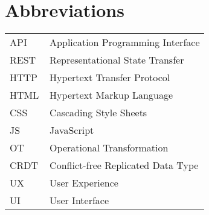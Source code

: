 \chapter*{Abbreviations}


\begin{flushleft}
\begin{tabular}{l p{0.8\linewidth}}
API      & Application Programming Interface\\
REST     & Representational State Transfer\\
HTTP     & Hypertext Transfer Protocol\\
HTML     & Hypertext Markup Language\\
CSS      & Cascading Style Sheets\\
JS       & JavaScript\\
OT       & Operational Transformation\\
CRDT     & Conflict-free Replicated Data Type\\
UX       & User Experience\\
UI       & User Interface\\
\end{tabular}
\end{flushleft}

